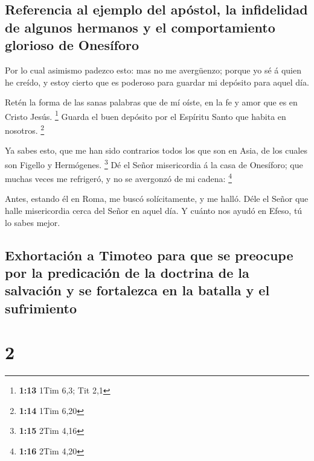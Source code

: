 \hypertarget{referencia-al-ejemplo-del-apuxf3stol-la-infidelidad-de-algunos-hermanos-y-el-comportamiento-glorioso-de-onesuxedforo}{%
\subsection{Referencia al ejemplo del apóstol, la infidelidad de algunos
hermanos y el comportamiento glorioso de
Onesíforo}\label{referencia-al-ejemplo-del-apuxf3stol-la-infidelidad-de-algunos-hermanos-y-el-comportamiento-glorioso-de-onesuxedforo}}

 Por lo cual asimismo padezco esto: mas no me avergüenzo;
porque yo sé á quien he creído, y estoy cierto que es poderoso para
guardar mi depósito para aquel día.

 Retén la forma de las sanas palabras que de mí oíste, en
la fe y amor que es en Cristo Jesús. \footnote{\textbf{1:13} 1Tim 6,3;
  Tit 2,1}  Guarda el buen depósito por el Espíritu Santo
que habita en nosotros. \footnote{\textbf{1:14} 1Tim 6,20}

 Ya sabes esto, que me han sido contrarios todos los que
son en Asia, de los cuales son Figello y Hermógenes. \footnote{\textbf{1:15}
  2Tim 4,16}  Dé el Señor misericordia á la casa de
Onesíforo; que muchas veces me refrigeró, y no se avergonzó de mi
cadena: \footnote{\textbf{1:16} 2Tim 4,20}

 Antes, estando él en Roma, me buscó solícitamente, y me
halló.  Déle el Señor que halle misericordia cerca del
Señor en aquel día. Y cuánto nos ayudó en Efeso, tú lo sabes mejor.

\hypertarget{exhortaciuxf3n-a-timoteo-para-que-se-preocupe-por-la-predicaciuxf3n-de-la-doctrina-de-la-salvaciuxf3n-y-se-fortalezca-en-la-batalla-y-el-sufrimiento}{%
\subsection{Exhortación a Timoteo para que se preocupe por la
predicación de la doctrina de la salvación y se fortalezca en la batalla
y el
sufrimiento}\label{exhortaciuxf3n-a-timoteo-para-que-se-preocupe-por-la-predicaciuxf3n-de-la-doctrina-de-la-salvaciuxf3n-y-se-fortalezca-en-la-batalla-y-el-sufrimiento}}

\hypertarget{section-1}{%
\section{2}\label{section-1}}


